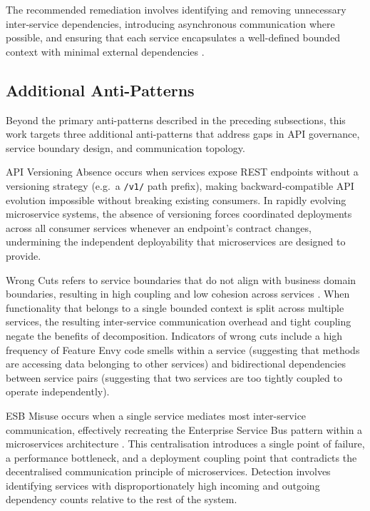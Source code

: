 The recommended remediation involves identifying and removing unnecessary inter-service dependencies, introducing asynchronous communication where possible, and ensuring that each service encapsulates a well-defined bounded context with minimal external dependencies \cite{Richardson2018}.

\subsection{Additional Anti-Patterns}
\label{subsec:anti-patterns-summary}

\par Beyond the primary anti-patterns described in the preceding subsections, this work targets three additional anti-patterns that address gaps in API governance, service boundary design, and communication topology.

\par API Versioning Absence occurs when services expose REST endpoints without a versioning strategy (e.g.\ a \texttt{/v1/} path prefix), making backward-compatible API evolution impossible without breaking existing consumers. In rapidly evolving microservice systems, the absence of versioning forces coordinated deployments across all consumer services whenever an endpoint's contract changes, undermining the independent deployability that microservices are designed to provide.

\par Wrong Cuts refers to service boundaries that do not align with business domain boundaries, resulting in high coupling and low cohesion across services \cite{Taibi2018}. When functionality that belongs to a single bounded context is split across multiple services, the resulting inter-service communication overhead and tight coupling negate the benefits of decomposition. Indicators of wrong cuts include a high frequency of Feature Envy code smells within a service (suggesting that methods are accessing data belonging to other services) and bidirectional dependencies between service pairs (suggesting that two services are too tightly coupled to operate independently).

\par ESB Misuse occurs when a single service mediates most inter-service communication, effectively recreating the Enterprise Service Bus pattern within a microservices architecture \cite{Richards2015}. This centralisation introduces a single point of failure, a performance bottleneck, and a deployment coupling point that contradicts the decentralised communication principle of microservices. Detection involves identifying services with disproportionately high incoming and outgoing dependency counts relative to the rest of the system.

